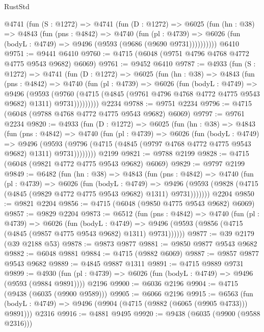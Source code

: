 \begin{lexlean}{RustStd}
\begin{coremodule}
    @4741
      (fun (S : @1272) =>
      @4741
        (fun (D : @1272) =>
        @6025
          (fun (hn : @38) =>
          @4843
            (fun (pns : @4842) =>
            @4740
              (fun (pl : @4739) =>
              @6026 (fun (bodyL : @4749) => @9496 (@9593 (@9686 (@9690 @9731))))))))))
    @6410
@9751 := @9441 @6410
@9760 := @4715 (@6048 (@9751 @4796 @4768 @4772 @4775 @9543 @9682) @6069)
@9761 := @9452 @6410
@9787 := @4933
    (fun (S : @1272) =>
    @4741
      (fun (D : @1272) =>
      @6025
        (fun (hn : @38) =>
        @4843
          (fun (pns : @4842) =>
          @4740
            (fun (pl : @4739) =>
            @6026
              (fun (bodyL : @4749) =>
              @9496
                (@9593
                  (@9760
                    (@4715 (@4845 (@9761 @4796 @4768 @4772 @4775 @9543 @9682) @1311) @9731)))))))))
    @2234
@9788 := @9751 @2234
@9796 := @4715 (@6048 (@9788 @4768 @4772 @4775 @9543 @9682) @6069)
@9797 := @9761 @2234
@9820 := @4933
    (fun (D : @1272) =>
    @6025
      (fun (hn : @38) =>
      @4843
        (fun (pns : @4842) =>
        @4740
          (fun (pl : @4739) =>
          @6026
            (fun (bodyL : @4749) =>
            @9496
              (@9593 (@9796 (@4715 (@4845 (@9797 @4768 @4772 @4775 @9543 @9682) @1311) @9731))))))))
    @2199
@9821 := @9788 @2199
@9828 := @4715 (@6048 (@9821 @4772 @4775 @9543 @9682) @6069)
@9829 := @9797 @2199
@9849 := @6482
    (fun (hn : @38) =>
    @4843
      (fun (pns : @4842) =>
      @4740
        (fun (pl : @4739) =>
        @6026
          (fun (bodyL : @4749) =>
          @9496 (@9593 (@9828 (@4715 (@4845 (@9829 @4772 @4775 @9543 @9682) @1311) @9731)))))))
    @2204
@9850 := @9821 @2204
@9856 := @4715 (@6048 (@9850 @4775 @9543 @9682) @6069)
@9857 := @9829 @2204
@9873 := @6512
    (fun (pns : @4842) =>
    @4740
      (fun (pl : @4739) =>
      @6026
        (fun (bodyL : @4749) =>
        @9496 (@9593 (@9856 (@4715 (@4845 (@9857 @4775 @9543 @9682) @1311) @9731))))))
@9877 := @39 @2179 (@39 @2188 @53)
@9878 := @9873 @9877
@9881 := @9850 @9877 @9543 @9682
@9882 := @6048 @9881
@9884 := @4715 (@9882 @6069)
@9887 := @9857 @9877 @9543 @9682
@9889 := @4845 @9887 @1311
@9891 := @4715 @9889 @9731
@9899 := @4930
    (fun (pl : @4739) => @6026 (fun (bodyL : @4749) => @9496 (@9593 (@9884 @9891))))
    @2196
@9900 := @6036 @2196
@9904 := @4715 (@9438 (@6035 (@9900 @9589)))
@9905 := @6066 @2196
@9915 := @6563
    (fun (bodyL : @4749) => @9496 (@9904 (@4715 (@9882 (@6065 (@9905 @4733))) @9891)))
    @2316
@9916 := @4881 @9495
@9920 := @9438 (@6035 (@9900 (@9588 @2316)))

\end{coremodule}
\end{lexlean}

